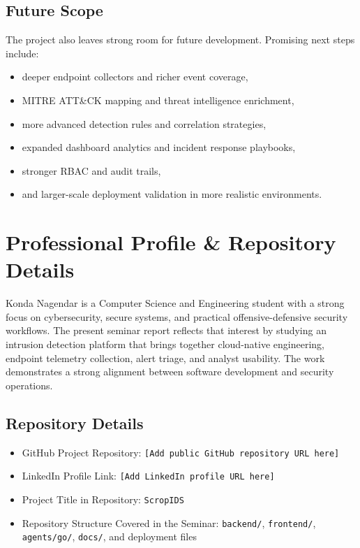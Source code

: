 \documentclass[12pt,a4paper]{report}
\begin{document}
\section{Future Scope}
The project also leaves strong room for future development. Promising next steps include:
\begin{itemize}
    \item deeper endpoint collectors and richer event coverage,
    \item MITRE ATT\&CK mapping and threat intelligence enrichment,
    \item more advanced detection rules and correlation strategies,
    \item expanded dashboard analytics and incident response playbooks,
    \item stronger RBAC and audit trails,
    \item and larger-scale deployment validation in more realistic environments.
\end{itemize}

\chapter*{Professional Profile \& Repository Details}
Konda Nagendar is a Computer Science and Engineering student with a strong focus on cybersecurity, secure systems, and practical offensive-defensive security workflows. The present seminar report reflects that interest by studying an intrusion detection platform that brings together cloud-native engineering, endpoint telemetry collection, alert triage, and analyst usability. The work demonstrates a strong alignment between software development and security operations.

\section*{Repository Details}
\begin{itemize}
    \item GitHub Project Repository: \texttt{[Add public GitHub repository URL here]}
    \item LinkedIn Profile Link: \texttt{[Add LinkedIn profile URL here]}
    \item Project Title in Repository: \texttt{ScropIDS}
    \item Repository Structure Covered in the Seminar: \texttt{backend/}, \texttt{frontend/}, \texttt{agents/go/}, \texttt{docs/}, and deployment files
\end{itemize}
\end{document}
